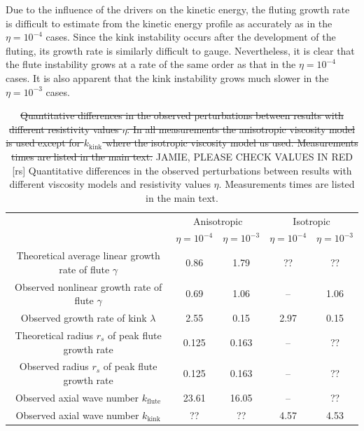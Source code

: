 \documentclass[fleqn,usenatbib]{mnras}
\newcommand{\rev}[1]{{\color{red} {#1}}}
\begin{document}
Due to the influence of the drivers on the kinetic energy, the fluting growth
rate is difficult to estimate from the kinetic energy profile as accurately as
in the $\eta=10^{-4}$ cases. Since the kink instability occurs after the
development of the fluting, its growth rate is similarly difficult to gauge.
Nevertheless, it is clear that the flute instability grows at a rate of the
same order as that in the $\eta=10^{-4}$ cases. It is also apparent that the
kink instability grows much slower in the $\eta=10^{-3}$ cases.

\begin{table}
\caption{\rev{\sout{Quantitative differences in the observed perturbations between results
\rev{with} different resistivity values $\eta$. In all measurements the
anisotropic viscosity model is used except for $k_\text{kink}$ where the
isotropic viscosity model us used. Measurements times are listed in the main
text.} JAMIE, PLEASE CHECK VALUES IN RED [rs]} Quantitative differences in the observed perturbations between results
\rev{with} different \rev{viscosity models and} resistivity values
$\eta$. Measurements times are listed in the main text.} 
\centering
\begin{tabular}{ccccc}
&\multicolumn{2}{c}{\rev{Anisotropic}}& \multicolumn{2}{c}{\rev{Isotropic}} \\
&
$\eta=10^{-4}$ &
$\eta=10^{-3}$ &
\rev{$\eta=10^{-4}$} &
\rev{$\eta=10^{-3}$} \\
\midrule
Theoretical average linear growth rate of flute $\gamma$ & 0.86 & 1.79
& \rev{??} & \rev{??} \\
Observed nonlinear growth rate of flute $\gamma$ & 0.69 & 1.06  &
\rev{--} & \rev{1.06}\\
Observed growth rate of kink $\lambda$ & 2.55 & 0.15 & \rev{2.97} & \rev{0.15}\\
\midrule
Theoretical radius $r_s$ of peak flute growth rate & 0.125 & 0.163 &
\rev{--} & \rev{??}\\
Observed radius $r_s$ of peak flute growth rate & 0.125 & 0.163 & \rev{--} & \rev{??}\\
\midrule
Observed axial wave number $k_{\text{flute}}$ & 23.61 & 16.05 & \rev{--} & \rev{??} \\
Observed axial wave number $k_{\text{kink}}$ & \rev{??} & \rev{??} & 4.57 & 4.53\\
\end{tabular}
\label{tab:kink_fluting_params}
\end{table}
\end{document}
